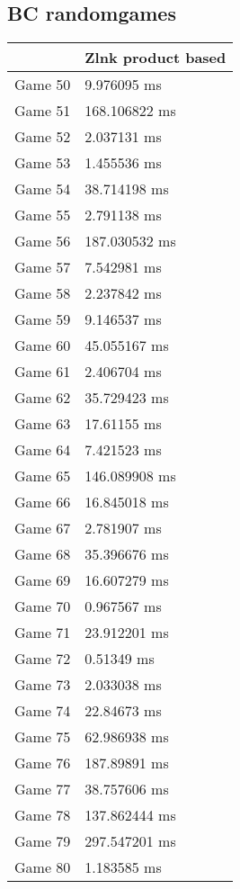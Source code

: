 \subsection{BC randomgames}
\begin{tabular}{|l|l|}
	\hline
	& Zlnk product based \\ \hline
	Game 50 & 9.976095 ms \\ \hline
	Game 51 & 168.106822 ms \\ \hline
	Game 52 & 2.037131 ms \\ \hline
	Game 53 & 1.455536 ms \\ \hline
	Game 54 & 38.714198 ms \\ \hline
	Game 55 & 2.791138 ms \\ \hline
	Game 56 & 187.030532 ms \\ \hline
	Game 57 & 7.542981 ms \\ \hline
	Game 58 & 2.237842 ms \\ \hline
	Game 59 & 9.146537 ms \\ \hline
	Game 60 & 45.055167 ms \\ \hline
	Game 61 & 2.406704 ms \\ \hline
	Game 62 & 35.729423 ms \\ \hline
	Game 63 & 17.61155 ms \\ \hline
	Game 64 & 7.421523 ms \\ \hline
	Game 65 & 146.089908 ms \\ \hline
	Game 66 & 16.845018 ms \\ \hline
	Game 67 & 2.781907 ms \\ \hline
	Game 68 & 35.396676 ms \\ \hline
	Game 69 & 16.607279 ms \\ \hline
	Game 70 & 0.967567 ms \\ \hline
	Game 71 & 23.912201 ms \\ \hline
	Game 72 & 0.51349 ms \\ \hline
	Game 73 & 2.033038 ms \\ \hline
	Game 74 & 22.84673 ms \\ \hline
	Game 75 & 62.986938 ms \\ \hline
	Game 76 & 187.89891 ms \\ \hline
	Game 77 & 38.757606 ms \\ \hline
	Game 78 & 137.862444 ms \\ \hline
	Game 79 & 297.547201 ms \\ \hline
	Game 80 & 1.183585 ms \\ \hline

\end{tabular}
